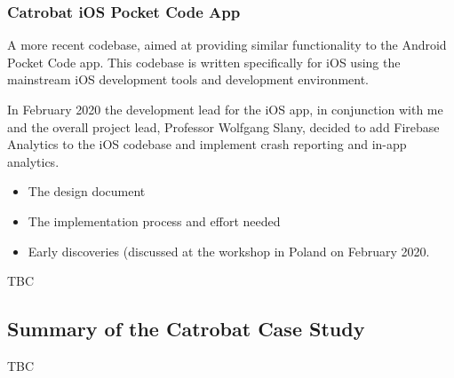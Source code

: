 \subsubsection{Catrobat iOS Pocket Code App}
A more recent codebase, aimed at providing similar functionality to the Android Pocket Code app. This codebase is written specifically for iOS using the mainstream iOS development tools and development environment. 

In February 2020 the development lead for the iOS app, in conjunction with me and the overall project lead, Professor Wolfgang Slany, decided to add Firebase Analytics to the iOS codebase and implement crash reporting and in-app analytics. 

\begin{itemize}
    \item The design document
    \item The implementation process and effort needed
    \item Early discoveries (discussed at the workshop in Poland on  February 2020.
\end{itemize}
TBC

\subsection{Summary of the Catrobat Case Study}
TBC
